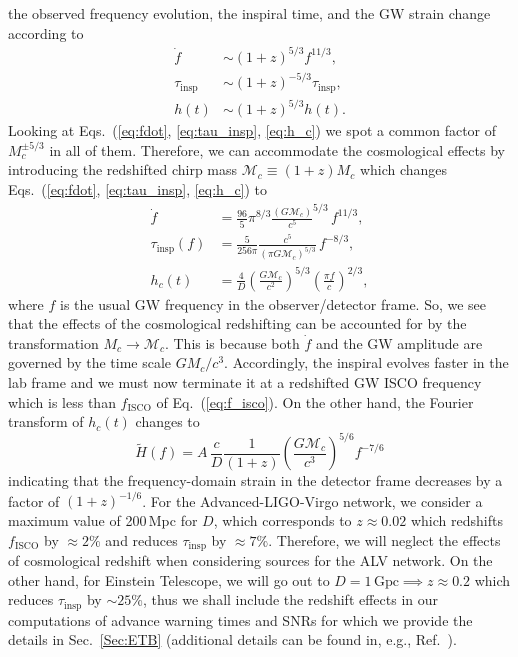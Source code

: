 \documentclass[prd,amsmath,amssymb,aps,floats,amsfonts,notitlepage,superscriptaddress,eqsecnum,nofootinbib,10pt]{revtex4-1}
\newcommand{\f}{\frac}
\newcommand{\be}{\begin{equation}}
\newcommand{\ee}{\end{equation}}
\begin{document}
\begin{enumerate}
the observed frequency evolution, the inspiral time, 
and the GW strain change according to %
\begin{align}
\dot{f}\ \ &\sim (1+z)^{5/3}{f}^{11/3},\\
\tau_\text{insp}& \sim (1+z)^{-5/3} \tau_{\text{insp}},\\
h(t) & \sim (1+z)^{5/3} h(t).
\end{align}
%
Looking at Eqs.~(\ref{eq:fdot}, \ref{eq:tau_insp}, \ref{eq:h_c}) we spot a common factor of $M_c^{\pm5/3}$ in all of them.
Therefore, we can accommodate the cosmological effects by introducing the redshifted chirp mass $\mathcal{M}_c\equiv (1+z) M_c$
which changes Eqs.~(\ref{eq:fdot}, \ref{eq:tau_insp}, \ref{eq:h_c}) to
%
\begin{align}
\dot{f} &= \f{96}{5}\pi^{8/3} \f{(G \mathcal{M}_c)}{c^5}^{5/3}\, f^{11/3} \label{eq:fdot_redshifted},\\
\tau_\text{insp}(f) &= \f{5}{256\pi}\f{c^5}{(\pi G \mathcal{M}_c)^{5/3}} \,f^{-8/3}\label{eq:tau_insp_redshifted}, \\
h_c(t) & = \f{4}{D}\left(\f{G \mathcal{M}_c}{c^2}\right)^{5/3}\left(\frac{\pi f}{c}\right)^{2/3} \label{eq:strain_TD_redshifted},
\end{align}
%
where $f$ is the usual GW frequency in the observer/detector frame.
So, we see that the effects of the cosmological redshifting can be accounted for by the transformation $M_c\rightarrow \mathcal{M}_c$.
This is because both $\dot{f}$ and the GW amplitude are governed by the time scale $G M_c/c^3$.
Accordingly, the inspiral evolves faster in the lab frame %
and we must now terminate it at a redshifted GW ISCO frequency which is less than $f_\text{ISCO}$ of Eq.~(\ref{eq:f_isco}).
On the other hand, the Fourier transform of $h_c(t)$ changes to 
%
\be
\tilde{H}(f) = A\, \f{c}{D} \f{1}{(1+z)} \left(\f{G \mathcal{M}_c}{c^3}\right)^{5/6} f^{-7/6}
\ee
indicating that the frequency-domain strain in the detector frame decreases by a factor of $(1+z)^{-1/6}$. %
%
For the Advanced-LIGO-Virgo network,
we consider a maximum value of 200\,Mpc for $D$,
which corresponds to $z \approx 0.02$ which redshifts $f_\text{ISCO}$ by $\approx 2\%$ and reduces $\tau_\text{insp}$ by $\approx 7\%$.
Therefore, we will neglect the effects of cosmological redshift 
when considering sources for the ALV network.
On the other hand, for Einstein Telescope, we will go out to $D=1\,\text{Gpc}\implies z\approx 0.2$
which reduces $\tau_\text{insp}$ by $\sim 25\%$, thus we shall include the redshift effects in our computations of advance warning times and SNRs
for which we provide the details in Sec.~\ref{Sec:ETB} (additional details can be found in, e.g., Ref.~\cite{Phinney:2001di}). 


\end{enumerate}
\end{document}

